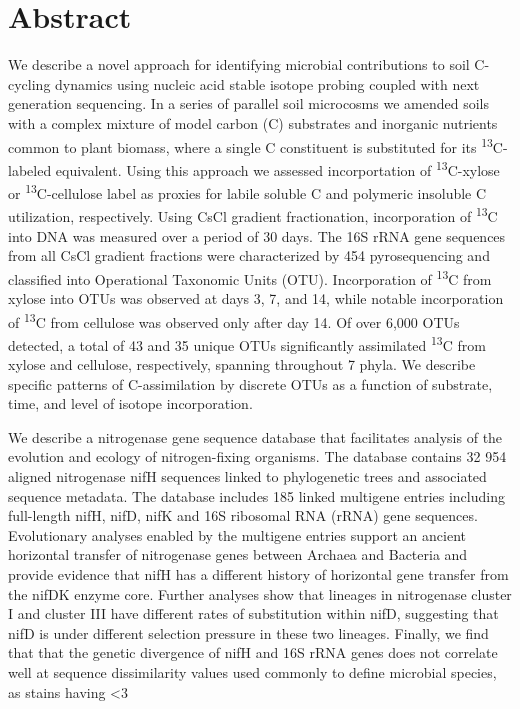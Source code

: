 \section{Abstract} 
We describe a novel approach for identifying microbial contributions to soil C-cycling dynamics using nucleic acid stable isotope probing coupled with next generation sequencing. In a series of parallel soil microcosms we amended soils with a complex mixture of model carbon (C) substrates and inorganic nutrients common to plant biomass, where a single C constituent is substituted for its \textsuperscript{13}C-labeled equivalent. Using this approach we assessed incorportation of \textsuperscript{13}C-xylose or \textsuperscript{13}C-cellulose label as proxies for labile soluble C and polymeric insoluble C utilization, respectively. Using CsCl gradient fractionation, incorporation of \textsuperscript{13}C into DNA was measured over a period of 30 days. The 16S rRNA gene sequences from all CsCl gradient fractions were characterized by 454 pyrosequencing and classified into Operational Taxonomic Units (OTU). Incorporation of \textsuperscript{13}C from xylose into OTUs was observed at days 3, 7, and 14, while notable incorporation of \textsuperscript{13}C from cellulose was observed only after day 14. Of over 6,000 OTUs detected, a total of 43 and 35 unique OTUs significantly assimilated \textsuperscript{13}C from xylose and cellulose, respectively, spanning throughout 7 phyla. We describe specific patterns of C-assimilation by discrete OTUs as a function of substrate, time, and level of isotope incorporation.

We describe a nitrogenase gene sequence database that facilitates analysis of the evolution and ecology of nitrogen-fixing organisms. The database contains 32 954 aligned nitrogenase nifH sequences linked to phylogenetic trees and associated sequence metadata. The database includes 185 linked multigene entries including full-length nifH, nifD, nifK and 16S ribosomal RNA (rRNA) gene sequences. Evolutionary analyses enabled by the multigene entries support an ancient horizontal transfer of nitrogenase genes between Archaea and Bacteria and provide evidence that nifH has a different history of horizontal gene transfer from the nifDK enzyme core. Further analyses show that lineages in nitrogenase cluster I and cluster III have different rates of substitution within nifD, suggesting that nifD is under different selection pressure in these two lineages. Finally, we find that that the genetic divergence of nifH and 16S rRNA genes does not correlate well at sequence dissimilarity values used commonly to define microbial species, as stains having <3%